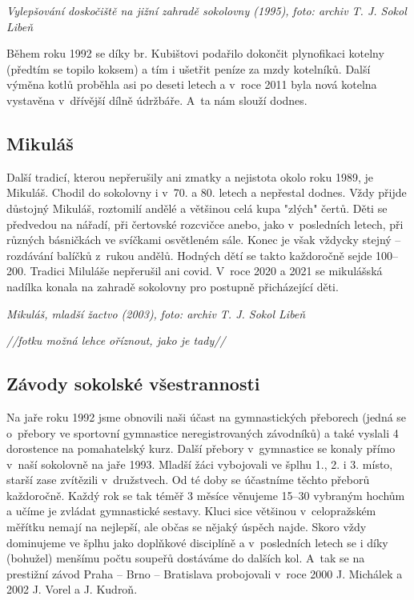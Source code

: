\documentclass[a5paper, 12pt, twoside]{article}
\begin{document}
\textit{Vylepšování doskočiště na jižní zahradě sokolovny (1995),}
\textit{foto: archiv T. J. Sokol Libeň}

Během roku 1992 se díky br. Kubištovi podařilo dokončit plynofikaci
kotelny (předtím se topilo koksem) a tím i ušetřit peníze za mzdy
kotelníků. Další výměna kotlů proběhla asi po deseti letech a v~roce
2011 byla nová kotelna vystavěna v~dřívější dílně údržbáře. A~ta nám
slouží dodnes.

\subsection{Mikuláš}

Další tradicí, kterou nepřerušily ani zmatky a nejistota okolo roku
1989, je Mikuláš. Chodil do sokolovny i v~70. a 80. letech a nepřestal
dodnes. Vždy přijde důstojný Mikuláš, roztomilí andělé a většinou celá
kupa "zlých" čertů. Děti se předvedou na nářadí, při čertovské
rozcvičce anebo, jako v~posledních letech, při různých básničkách ve
svíčkami osvětleném sále. Konec je však vždycky stejný -- rozdávání
balíčků z~rukou andělů. Hodných dětí se takto každoročně sejde 100--200.
Tradici Miluláše nepřerušil ani covid. V~roce 2020 a 2021 se mikulášská
nadílka konala na zahradě sokolovny pro postupně přicházející děti.


\textit{Mikuláš, mladší žactvo (2003),} \textit{foto: archiv T. J. Sokol
Libeň}

\textit{//fotku možná lehce oříznout, jako je tady//}

\subsection{Závody sokolské
všestrannosti}

Na jaře roku 1992 jsme obnovili naši účast na gymnastických přeborech
(jedná se o~přebory ve sportovní gymnastice neregistrovaných závodníků)
a také vyslali 4 dorostence na pomahatelský kurz. Další přebory
v~gymnastice se konaly přímo v~naší sokolovně na jaře 1993. Mladší žáci
vybojovali ve šplhu 1., 2. i 3. místo, starší zase zvítězili
v~družstvech. Od té doby se účastníme těchto přeborů každoročně. Každý rok
se tak téměř 3 měsíce věnujeme 15--30 vybraným hochům a učíme je zvládat
gymnastické sestavy. Kluci sice většinou v~celopražském měřítku nemají
na nejlepší, ale občas se nějaký úspěch najde. Skoro vždy dominujeme ve
šplhu jako doplňkové disciplíně a v~posledních letech se i díky
(bohužel) menšímu počtu soupeřů dostáváme do dalších kol. A~tak se na
prestižní závod Praha -- Brno -- Bratislava probojovali v~roce 2000 J.
Michálek a 2002 J. Vorel a J. Kudroň.
\end{document}

